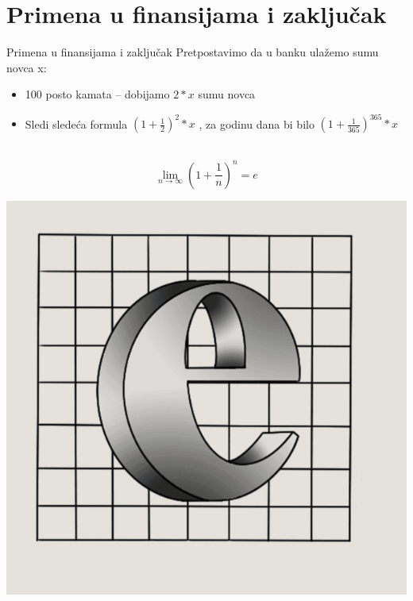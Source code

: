 \documentclass[xcolor=dvipsnames]{beamer}
\begin{document}
       \section{Primena u finansijama i zaključak}
    \begin{frame}
    \begin{block}{Primena u finansijama i zaključak}
     Pretpostavimo da u banku ulažemo sumu novca x:\\
    \begin{itemize}
        \item 100 posto kamata -- dobijamo $2*x$ sumu novca \\
        \item  Sledi sledeća formula $( 1 + \frac{1}{2} )^2 * x$ , za godinu dana bi bilo  $( 1 + \frac{1}{365} )^{365} * x$ \\\\
    \end{itemize}
       \begin{equation}\lim_{n \rightarrow \infty} (1+\frac{1}{n})^n=e \end{equation}
   \end{block}
    \begin{center}
    \includegraphics[height=3.cm]{SlikaE.png}
    \end{center}
   \end{frame}    
\end{document}
